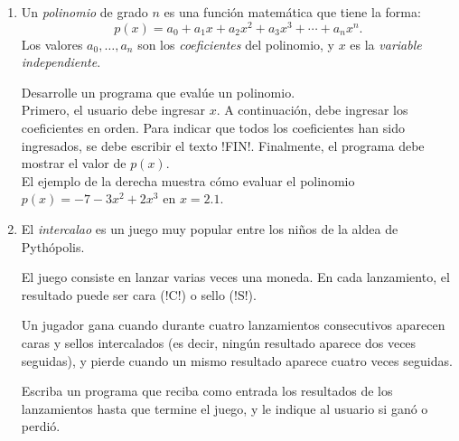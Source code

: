 \documentclass[11pt,spanish]{article}
\newcommand{\pond}[1]{[{\small\textbf{#1\%}}]}
\begin{document}
\begin{enumerate}[font=\Large\bfseries]
    \newpage
    \item
      \pond{25}
      Un \emph{polinomio} de grado \(n\)
      es una función matemática que tiene la forma:
      \[
        p(x) =
        a_0     +
        a_1 x   +
        a_2 x^2 +
        a_3 x^3 +
        \cdots +
        a_n x^n.
      \]
      Los valores \(a_0, \ldots, a_n\)
      son los \emph{coeficientes} del polinomio,
      y \(x\) es la \emph{variable independiente}.

      \begin{minipage}[t]{.63\textwidth}
        Desarrolle un programa
        que evalúe un polinomio.
        \\[1ex]
        Primero,
        el usuario debe ingresar \(x\).
        A continuación,
        debe ingresar los coeficientes en orden.
        Para indicar que todos los coeficientes han sido ingresados,
        se debe escribir el texto \li!FIN!.
        Finalmente,
        el programa debe mostrar
        el valor de \(p(x)\).
        \\[1ex]
        El ejemplo de la derecha
        muestra cómo evaluar el polinomio
        \(p(x) = -7 - 3x^2 + 2x^3\) en \(x = 2.1\).
      \end{minipage}
      \hfill
      \begin{minipage}[t]{.26\textwidth}
        
      \end{minipage}

    \newpage
    \item
      \pond{25}
      El \emph{intercalao} es un juego muy popular
      entre los niños de la aldea de Pythópolis.

      El juego consiste en lanzar varias veces una moneda.
      En cada lanzamiento,
      el resultado puede ser cara (\li!C!) o sello (\li!S!).

      Un jugador gana cuando durante cuatro lanzamientos consecutivos
      aparecen caras y sellos intercalados
      (es decir, ningún resultado aparece dos veces seguidas),
      y pierde cuando un mismo resultado aparece
      cuatro veces seguidas.

      Escriba un programa que reciba como entrada
      los resultados de los lanzamientos
      hasta que termine el juego,
      y le indique al usuario si ganó o perdió.

      \begin{minipage}[t]{.26\textwidth}
        
      \end{minipage}
      \hspace{1em}
      \begin{minipage}[t]{.26\textwidth}
        
      \end{minipage}

  \end{enumerate}
\end{document}
